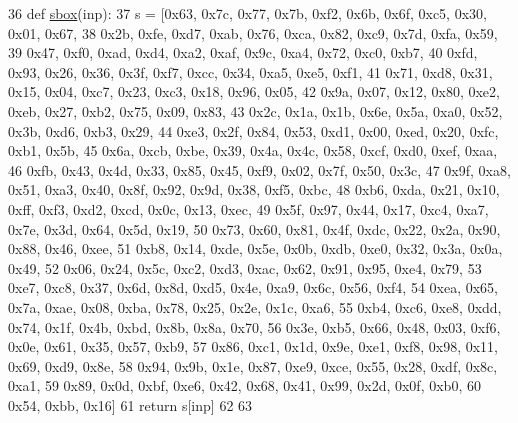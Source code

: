 \begin{DoxyCode}
36 \textcolor{keyword}{def }\hyperlink{namespacesoftware_1_1chipwhisperer_1_1analyzer_1_1models_1_1aes_1_1key__schedule_ab403ea833b4e70350f2fb974d3d2adf3}{sbox}(inp):
37     s =  [0x63, 0x7c, 0x77, 0x7b, 0xf2, 0x6b, 0x6f, 0xc5, 0x30, 0x01, 0x67,
38             0x2b, 0xfe, 0xd7, 0xab, 0x76, 0xca, 0x82, 0xc9, 0x7d, 0xfa, 0x59,
39             0x47, 0xf0, 0xad, 0xd4, 0xa2, 0xaf, 0x9c, 0xa4, 0x72, 0xc0, 0xb7,
40             0xfd, 0x93, 0x26, 0x36, 0x3f, 0xf7, 0xcc, 0x34, 0xa5, 0xe5, 0xf1,
41             0x71, 0xd8, 0x31, 0x15, 0x04, 0xc7, 0x23, 0xc3, 0x18, 0x96, 0x05,
42             0x9a, 0x07, 0x12, 0x80, 0xe2, 0xeb, 0x27, 0xb2, 0x75, 0x09, 0x83,
43             0x2c, 0x1a, 0x1b, 0x6e, 0x5a, 0xa0, 0x52, 0x3b, 0xd6, 0xb3, 0x29,
44             0xe3, 0x2f, 0x84, 0x53, 0xd1, 0x00, 0xed, 0x20, 0xfc, 0xb1, 0x5b,
45             0x6a, 0xcb, 0xbe, 0x39, 0x4a, 0x4c, 0x58, 0xcf, 0xd0, 0xef, 0xaa,
46             0xfb, 0x43, 0x4d, 0x33, 0x85, 0x45, 0xf9, 0x02, 0x7f, 0x50, 0x3c,
47             0x9f, 0xa8, 0x51, 0xa3, 0x40, 0x8f, 0x92, 0x9d, 0x38, 0xf5, 0xbc,
48             0xb6, 0xda, 0x21, 0x10, 0xff, 0xf3, 0xd2, 0xcd, 0x0c, 0x13, 0xec,
49             0x5f, 0x97, 0x44, 0x17, 0xc4, 0xa7, 0x7e, 0x3d, 0x64, 0x5d, 0x19,
50             0x73, 0x60, 0x81, 0x4f, 0xdc, 0x22, 0x2a, 0x90, 0x88, 0x46, 0xee,
51             0xb8, 0x14, 0xde, 0x5e, 0x0b, 0xdb, 0xe0, 0x32, 0x3a, 0x0a, 0x49,
52             0x06, 0x24, 0x5c, 0xc2, 0xd3, 0xac, 0x62, 0x91, 0x95, 0xe4, 0x79,
53             0xe7, 0xc8, 0x37, 0x6d, 0x8d, 0xd5, 0x4e, 0xa9, 0x6c, 0x56, 0xf4,
54             0xea, 0x65, 0x7a, 0xae, 0x08, 0xba, 0x78, 0x25, 0x2e, 0x1c, 0xa6,
55             0xb4, 0xc6, 0xe8, 0xdd, 0x74, 0x1f, 0x4b, 0xbd, 0x8b, 0x8a, 0x70,
56             0x3e, 0xb5, 0x66, 0x48, 0x03, 0xf6, 0x0e, 0x61, 0x35, 0x57, 0xb9,
57             0x86, 0xc1, 0x1d, 0x9e, 0xe1, 0xf8, 0x98, 0x11, 0x69, 0xd9, 0x8e,
58             0x94, 0x9b, 0x1e, 0x87, 0xe9, 0xce, 0x55, 0x28, 0xdf, 0x8c, 0xa1,
59             0x89, 0x0d, 0xbf, 0xe6, 0x42, 0x68, 0x41, 0x99, 0x2d, 0x0f, 0xb0,
60             0x54, 0xbb, 0x16]
61     \textcolor{keywordflow}{return} s[inp]
62 
63 
\end{DoxyCode}
\hypertarget{namespacesoftware_1_1chipwhisperer_1_1analyzer_1_1models_1_1aes_1_1key__schedule_a738dfc04cf684936da826dcde7488983}{}
